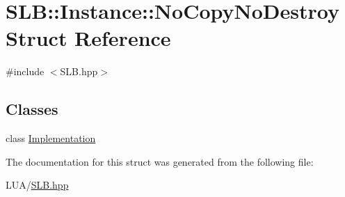 \hypertarget{structSLB_1_1Instance_1_1NoCopyNoDestroy}{}\section{S\+LB\+:\+:Instance\+:\+:No\+Copy\+No\+Destroy Struct Reference}
\label{structSLB_1_1Instance_1_1NoCopyNoDestroy}


{\ttfamily \#include $<$S\+L\+B.\+hpp$>$}

\subsection*{Classes}
\begin{DoxyCompactItemize}
\item 
class \hyperlink{classSLB_1_1Instance_1_1NoCopyNoDestroy_1_1Implementation}{Implementation}
\end{DoxyCompactItemize}


The documentation for this struct was generated from the following file\+:\begin{DoxyCompactItemize}
\item 
L\+U\+A/\hyperlink{SLB_8hpp}{S\+L\+B.\+hpp}\end{DoxyCompactItemize}
